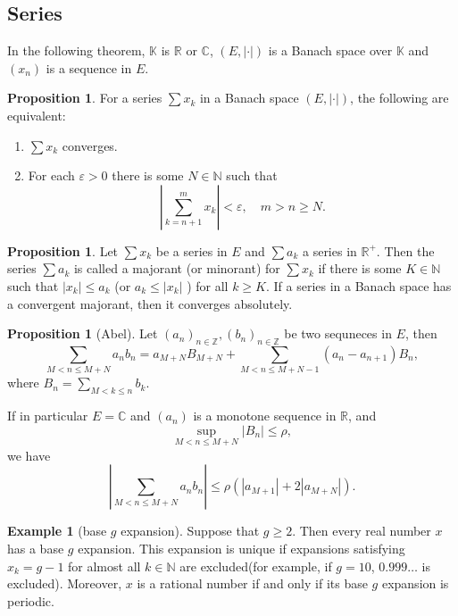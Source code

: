 \documentclass[12pt,a4paper]{book}
\newcommand{\bb}[1]{\mathbb{#1}}
\newenvironment{enu}{\begin{enumerate}[(1)]}{\end{enumerate}}
\theoremstyle{definition}
\newtheorem{coro}[defn]{Corollary}
\newtheorem{prop}[defn]{Proposition}
\newtheorem{exam}[defn]{Example}
\begin{document}
\subsection{Series}
In the following theorem, $\bb{K}$ is $\bb{R}$ or $\bb{C}$, 
$(E,|\cdot|)$ is a Banach space over $\bb{K}$ and $(x_n)$ is a sequence in $E$.
\begin{prop}
    For a series $\sum x_k$ in a Banach space $(E,|\cdot|)$, the following are equivalent:
    \begin{enu}
        \item  $\sum x_k$ converges.
        \item  For each $\varepsilon>0$ there is some $N \in \mathbb{N}$ such that
        $$
            \left|\sum_{k=n+1}^m x_k\right|<\varepsilon, \quad m>n \geq N .
        $$
    \end{enu}
\end{prop}
\begin{prop}
    Let $\sum x_k$ be a series in $E$ and $\sum a_k$ a series in $\mathbb{R}^{+}$. Then the series $\sum a_k$ is called a majorant (or minorant) for $\sum x_k$ if there is some $K \in \mathbb{N}$ such that $\left|x_k\right| \leq a_k$ (or $a_k \leq\left|x_k\right|$ ) for all $k \geq K$.
    If a series in a Banach space has a convergent majorant, then it converges absolutely.
\end{prop}
\begin{prop}[Abel]
    Let $\left(a_n\right)_{n \in \mathbb{Z}}, \left(b_n\right)_{n \in \mathbb{Z}}$ be two sequneces in $E$, then
    $$
        \sum_{M<n \leqslant M+N} a_n b_n=a_{M+N} B_{M+N}+\sum_{M<n \leqslant M+N-1}\left(a_n-a_{n+1}\right) B_n,
    $$
    where $B_n=\sum_{M<k \leqslant n} b_k$.

    If in particular $E=\bb{C}$ and $(a_n)$ is a monotone sequence in $\bb{R}$, and
    $$
        \sup _{M<n \leqslant M+N}\left|B_n\right| \leqslant \rho,
    $$
    we have
    $$
        \left|\sum_{M<n \leqslant M+N} a_n b_n\right| \leqslant \rho\left(\left|a_{M+1}\right|+2\left|a_{M+N}\right|\right) .
    $$
\end{prop}
\begin{exam}[base $g$ expansion]
    Suppose that $g \geq 2$. Then every real number $x$ has a base $g$ expansion. This expansion is unique if expansions satisfying $x_k=g-1$ for almost all $k \in \mathbb{N}$ are excluded(for example, if $g=10$, 
    $0.999\dots$ is excluded).
    Moreover, $x$ is a rational number if and only if its base $g$ expansion is periodic.
\end{exam}
\end{document}
